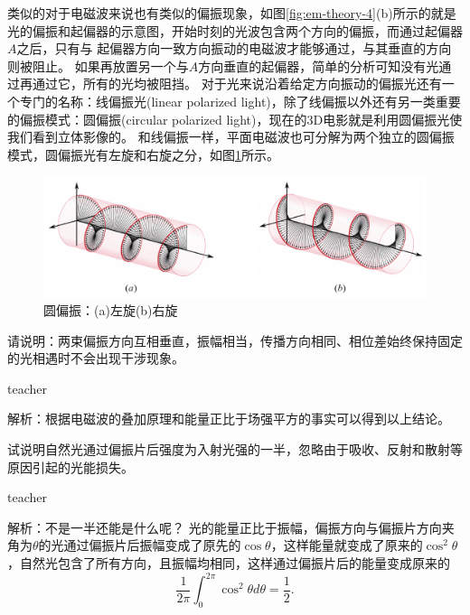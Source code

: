 类似的对于电磁波来说也有类似的偏振现象，如图\ref{fig:em-theory-4}(b)所示的就是光的偏振和起偏器的示意图，开始时刻的光波包含两个方向的偏振，而通过起偏器$A$之后，只有与
起偏器方向一致方向振动的电磁波才能够通过，与其垂直的方向则被阻止。
如果再放置另一个与$A$方向垂直的起偏器，简单的分析可知没有光通过再通过它，所有的光均被阻挡。
对于光来说沿着给定方向振动的偏振光还有一个专门的名称：{\heiti 线偏振光}(linear polarized light)，除了线偏振以外还有另一类重要的偏振模式：{\heiti 圆偏振}(circular polarized light)，现在的3D电影就是利用圆偏振光使我们看到立体影像的。
和线偏振一样，平面电磁波也可分解为两个独立的圆偏振模式，圆偏振光有左旋和右旋之分，如图\ref{fig: wave-optics-7}所示。


\begin{figure}
\centering
\includegraphics[width=0.8\linewidth]{images/wave-optics-7}
\caption{圆偏振：(a)左旋(b)右旋}
\label{fig: wave-optics-7}
\end{figure}



\begin{example}

请说明：两束偏振方向互相垂直，振幅相当，传播方向相同、相位差始终保持固定的光相遇时不会出现干涉现象。
\begin{taggedblock}{teacher}

解析：根据电磁波的叠加原理和能量正比于场强平方的事实可以得到以上结论。
\end{taggedblock}
\end{example}



\begin{example}

试说明自然光通过偏振片后强度为入射光强的一半，忽略由于吸收、反射和散射等原因引起的光能损失。
\begin{taggedblock}{teacher}

解析：不是一半还能是什么呢？
光的能量正比于振幅，偏振方向与偏振片方向夹角为$\theta$的光通过偏振片后振幅变成了原先的$\cos\theta$，这样能量就变成了原来的$\cos^2\theta$，自然光包含了所有方向，且振幅均相同，这样通过偏振片后的能量变成原来的
\[
\frac{1}{2\pi}\int_0^{2\pi}\cos^2\theta d\theta = \frac{1}{2}.
\]
\end{taggedblock}
\end{example}
